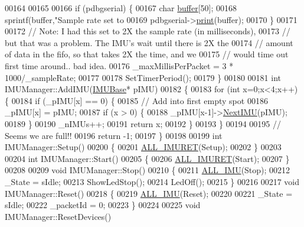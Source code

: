 \begin{DoxyCode}
00164     
00165     
00166     \textcolor{keywordflow}{if} (pdbgserial) \{
00167         \textcolor{keywordtype}{char} \hyperlink{_i_m_u_manager_8cpp_a858e0513a46bec1d794f9487c41a969d}{buffer}[50];
00168         sprintf(buffer,\textcolor{stringliteral}{"Sample rate set to %
00169         pdbgserial->\hyperlink{class_print_aa7b0a6dc63e3d27effd8459e3d443b83}{print}(buffer);
00170     \}
00171 
00172     \textcolor{comment}{// Note: I had this set to 2X the sample rate (in milliseconds),}
00173     \textcolor{comment}{// but that was a problem. The IMU's wait until there is 2X the}
00174     \textcolor{comment}{// amount of data in the fifo, so that takes 2X the time, and we}
00175     \textcolor{comment}{// would time out first time around.. bad idea.}
00176     \_maxMillisPerPacket = 3 * 1000/\_sampleRate;
00177     
00178     SetTimerPeriod();
00179 \}
00180 
00181 \textcolor{keywordtype}{int} IMUManager::AddIMU(\hyperlink{class_i_m_u_base}{IMUBase}* pIMU)
00182 \{
00183     \textcolor{keywordflow}{for} (\textcolor{keywordtype}{int} x=0;x<4;x++) \{
00184         \textcolor{keywordflow}{if} (\_pIMU[x] == 0) \{
00185             \textcolor{comment}{// Add into first empty spot}
00186             \_pIMU[x] = pIMU;
00187             \textcolor{keywordflow}{if} (x > 0) \{
00188                 \_pIMU[x-1]->\hyperlink{class_i_m_u_base_aa9c09bfd70f81b4a2df20cc5ae1474c3}{NextIMU}(pIMU);
00189             \}
00190             \_nIMUs++;
00191             \textcolor{keywordflow}{return} x;
00192         \}
00193     \}
00194     
00195     \textcolor{comment}{// Seems we are full!!}
00196     \textcolor{keywordflow}{return} -1;
00197 \}
00198 
00199 \textcolor{keywordtype}{int} IMUManager::Setup()
00200 \{
00201     \hyperlink{_i_m_u_manager_8cpp_a828c5d30222c335baef3647758f6847e}{ALL_IMURET}(Setup);
00202 \}
00203 
00204 \textcolor{keywordtype}{int} IMUManager::Start()
00205 \{
00206     \hyperlink{_i_m_u_manager_8cpp_a828c5d30222c335baef3647758f6847e}{ALL_IMURET}(Start);
00207 \}
00208 
00209 \textcolor{keywordtype}{void} IMUManager::Stop()
00210 \{
00211     \hyperlink{_i_m_u_manager_8cpp_a1ad801a60513fb69f99c2732ca068726}{ALL_IMU}(Stop);
00212     \_State = sIdle;
00213     ShowLedStop();  
00214     LedOff();
00215 \}
00216 
00217 \textcolor{keywordtype}{void} IMUManager::Reset()
00218 \{
00219     \hyperlink{_i_m_u_manager_8cpp_a1ad801a60513fb69f99c2732ca068726}{ALL_IMU}(Reset);
00220     
00221     \_State = sIdle; 
00222     \_packetId       = 0;
00223 \}
00224 
00225 \textcolor{keywordtype}{void} IMUManager::ResetDevices()
}
\end{DoxyCode}
